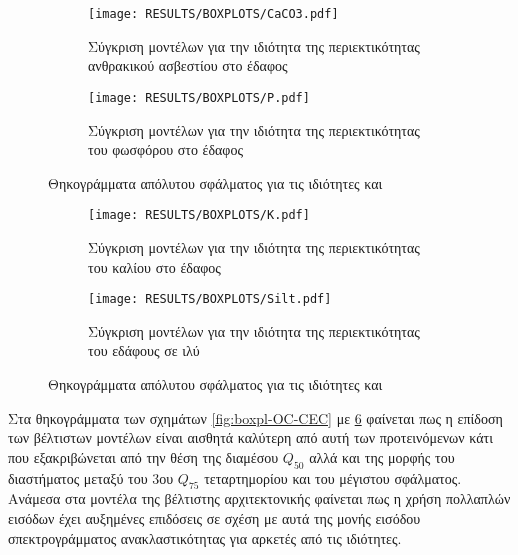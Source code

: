 \begin{figure}[H]
    \begin{subfigure}{0.5\textwidth}
        \texttt{[image: RESULTS/BOXPLOTS/CaCO3.pdf]}
        \caption{Σύγκριση μοντέλων για την ιδιότητα της περιεκτικότητας ανθρακικού ασβεστίου στο έδαφος}
        \label{fig:CaCO3_boxplot}
    \end{subfigure}
    \begin{subfigure}{0.5\textwidth}
        \texttt{[image: RESULTS/BOXPLOTS/P.pdf]}
        \caption{Σύγκριση μοντέλων για την ιδιότητα της περιεκτικότητας του φωσφόρου στο έδαφος}
        \label{fig:P_boxplot}
    \end{subfigure}
    \caption{Θηκογράμματα απόλυτου σφάλματος για τις ιδιότητες  και }
    \label{fig:boxpl-CaCO3-P}
\end{figure}
\begin{figure}[H]
    \begin{subfigure}{0.5\textwidth}
        \texttt{[image: RESULTS/BOXPLOTS/K.pdf]}
        \caption{Σύγκριση μοντέλων για την ιδιότητα της περιεκτικότητας του καλίου στο έδαφος}
        \label{fig:K_boxplot}
    \end{subfigure}
    \begin{subfigure}{0.5\textwidth}
        \texttt{[image: RESULTS/BOXPLOTS/Silt.pdf]}
        \caption{Σύγκριση μοντέλων για την ιδιότητα της περιεκτικότητας του εδάφους σε ιλύ}
        \label{fig:Silt_boxplot}
    \end{subfigure}
    \caption{Θηκογράμματα απόλυτου σφάλματος για τις ιδιότητες  και }
    \label{fig:boxpl-K-Silt}
\end{figure}

Στα θηκογράμματα των σχημάτων \ref{fig:boxpl-OC-CEC} με \ref{fig:boxpl-K-Silt} φαίνεται πως η επίδοση των βέλτιστων μοντέλων είναι αισθητά καλύτερη από αυτή των προτεινόμενων κάτι που εξακριβώνεται από την θέση της διαμέσου $Q_{50}$ αλλά και της μορφής του διαστήματος μεταξύ του 3ου $Q_{75}$ τεταρτημορίου και του μέγιστου σφάλματος. Ανάμεσα στα μοντέλα της βέλτιστης αρχιτεκτονικής φαίνεται πως η χρήση πολλαπλών εισόδων έχει αυξημένες επιδόσεις σε σχέση με αυτά της μονής εισόδου σπεκτρογράμματος ανακλαστικότητας για αρκετές από τις ιδιότητες.

